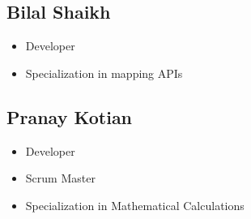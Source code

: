 \documentclass{article}
\begin{document}
\subsection*{Bilal Shaikh}

\begin{itemize}
	\item Developer
	\item Specialization in mapping APIs
\end{itemize}

\subsection*{Pranay Kotian}

\begin{itemize}
	\item Developer
	\item Scrum Master
  \item Specialization in Mathematical Calculations
\end{itemize}
\end{document}
